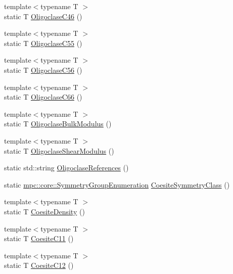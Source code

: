 \begin{DoxyCompactItemize}
\item 
{\footnotesize template$<$typename T $>$ }\\static T \mbox{\hyperlink{namespacempc_1_1data_abf1b5dff093ded1435b7cb0a198d803f}{Oligoclase\+C46}} ()
\item 
{\footnotesize template$<$typename T $>$ }\\static T \mbox{\hyperlink{namespacempc_1_1data_a22a93ecb7cf979d8825334eaaedbe60e}{Oligoclase\+C55}} ()
\item 
{\footnotesize template$<$typename T $>$ }\\static T \mbox{\hyperlink{namespacempc_1_1data_ae3a76797a25aa94f89e94ed74f3a804a}{Oligoclase\+C56}} ()
\item 
{\footnotesize template$<$typename T $>$ }\\static T \mbox{\hyperlink{namespacempc_1_1data_a2dd85fb6eaf535a632672bba37d56620}{Oligoclase\+C66}} ()
\item 
{\footnotesize template$<$typename T $>$ }\\static T \mbox{\hyperlink{namespacempc_1_1data_a3147a663120c06f34316ad1df85adb1d}{Oligoclase\+Bulk\+Modulus}} ()
\item 
{\footnotesize template$<$typename T $>$ }\\static T \mbox{\hyperlink{namespacempc_1_1data_a8cc34873fd27a627bc779da67e8ab6ce}{Oligoclase\+Shear\+Modulus}} ()
\item 
static std\+::string \mbox{\hyperlink{namespacempc_1_1data_a353459079b0c82e2fcf4d61f13c4d595}{Oligoclase\+References}} ()
\item 
static \mbox{\hyperlink{namespacempc_1_1core_a9d979684062547055a0ef5c13077bad8}{mpc\+::core\+::\+Symmetry\+Group\+Enumeration}} \mbox{\hyperlink{namespacempc_1_1data_ae379de7ea9a9a29e7c34687d65c29dca}{Coesite\+Symmetry\+Class}} ()
\item 
{\footnotesize template$<$typename T $>$ }\\static T \mbox{\hyperlink{namespacempc_1_1data_a991394fa685497afccfa74740b6da63c}{Coesite\+Density}} ()
\item 
{\footnotesize template$<$typename T $>$ }\\static T \mbox{\hyperlink{namespacempc_1_1data_a9a52412c9955c37082dfb735bce62578}{Coesite\+C11}} ()
\item 
{\footnotesize template$<$typename T $>$ }\\static T \mbox{\hyperlink{namespacempc_1_1data_a0588a25ac2a6d4980bbe53e28e56f057}{Coesite\+C12}} ()
\item 

\end{DoxyCompactItemize}
